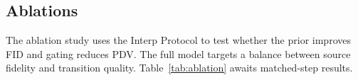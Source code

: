 \subsection{Ablations}
\label{sec:ablations}

The ablation study uses the Interp Protocol to test whether the prior improves FID and
gating reduces PDV. The full model targets a balance between source
fidelity and transition quality. Table~\ref{tab:ablation} awaits
matched-step results.


